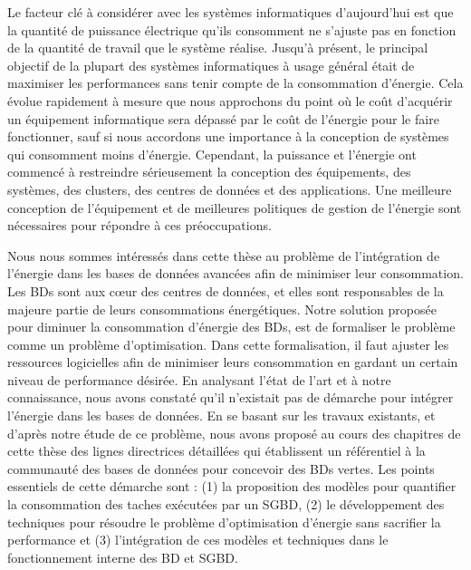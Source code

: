 Le facteur clé à considérer avec les systèmes informatiques d'aujourd'hui est que la quantité de puissance électrique qu'ils consomment ne s'ajuste pas en fonction de la quantité de travail que le système réalise. Jusqu'à présent, le principal objectif de la plupart des systèmes informatiques à usage général était de maximiser les performances sans tenir compte de la consommation d'énergie. Cela évolue rapidement à mesure que nous approchons du point où le coût d'acquérir un équipement informatique sera dépassé par le coût de l'énergie pour le faire fonctionner, sauf si nous accordons une importance à la conception de systèmes qui consomment moins d'énergie. Cependant, la puissance et l'énergie ont commencé à restreindre sérieusement la conception des équipements, des systèmes, des clusters, des centres de données et des applications. Une meilleure conception de l'équipement et de meilleures politiques de gestion de l'énergie sont nécessaires pour répondre à ces préoccupations.

Nous nous sommes intéressés dans cette thèse au problème de l'intégration de l'énergie dans les bases de données avancées afin de minimiser leur consommation. Les BDs sont aux cœur des centres de données, et elles sont responsables de la majeure partie de leurs consommations énergétiques. Notre solution proposée pour diminuer la consommation d'énergie des BDs, est de formaliser le problème comme un problème d'optimisation. Dans cette formalisation, il faut ajuster les ressources logicielles afin de minimiser leurs consommation en gardant un certain niveau de performance désirée.
En analysant l'état de l'art et à notre connaissance, nous avons constaté qu'il n'existait pas de démarche pour intégrer l'énergie dans les bases de données. En se basant sur les travaux existants, et d'après notre étude de ce problème, nous avons proposé au cours des chapitres de cette thèse des lignes directrices détaillées qui établissent un référentiel à la communauté des bases de données pour concevoir des BDs vertes. Les points essentiels de cette démarche sont : (1) la proposition des modèles pour quantifier la consommation des taches exécutées par un SGBD, (2) le développement des techniques pour résoudre le problème d'optimisation d'énergie sans sacrifier la performance et (3) l'intégration de ces modèles et techniques dans le fonctionnement interne des BD et SGBD.

